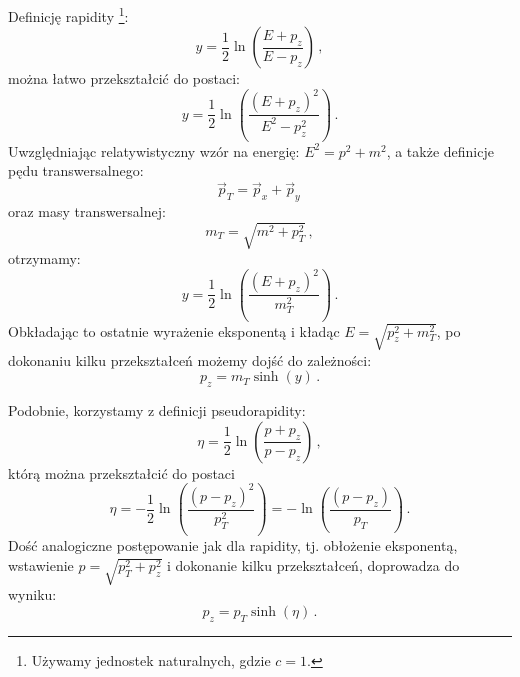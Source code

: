 \documentclass[a4paper,12pt]{article}
\begin{document}
Definicję rapidity \footnote{Używamy jednostek naturalnych, gdzie $c=1$.}:
\begin{equation} \label{eq:rapid}
y = \frac{1}{2} \ln \left( \frac{E + p_z}{E - p_z} \right)\,,
\end{equation}
można łatwo przekształcić do postaci:
\begin{equation} \label{eq:rapid1}
y = \frac{1}{2} \ln \left( \frac{(E + p_z)^2}{E^2 - p_z^2} \right)\,.
\end{equation}
Uwzględniając relatywistyczny wzór na energię: $E^2 = p^2 + m^2$, a także definicje pędu transwersalnego:
\begin{equation} \label{eq:pt}
\vec{p}_T = \vec{p}_x + \vec{p}_y \,
\end{equation}
oraz masy transwersalnej:
\begin{equation} \label{eq:mt}
m_T = \sqrt{m^2 + p_T^2} \,,
\end{equation}
otrzymamy:
\begin{equation} \label{eq:rapid2}
y = \frac{1}{2} \ln \left( \frac{(E + p_z)^2}{m_T^2} \right)\,.
\end{equation}
Obkładając to ostatnie wyrażenie eksponentą i kładąc $E = \sqrt{p_z^2 + m_T^2}$, po dokonaniu kilku przekształceń możemy dojść do zależności:
\begin{equation} \label{eq:pz-rapid}
p_z = m_{T} \sinh(y)\,.
\end{equation}

Podobnie, korzystamy z definicji pseudorapidity:
\begin{equation} \label{eq:pseudorap}
\eta = \frac{1}{2} \ln \left( \frac{p + p_z}{p - p_z} \right)\,,
\end{equation}
którą można przekształcić do postaci
\begin{equation} \label{eq:pseudorap1}
\eta = -\frac{1}{2} \ln \left( \frac{(p - p_z)^2}{p_T^2} \right) = -\ln \left( \frac{(p - p_z)}{p_T} \right) \,.
\end{equation}
Dość analogiczne postępowanie jak dla rapidity, tj. obłożenie eksponentą, wstawienie $p = \sqrt{p_T^2 + p_z^2}$ i dokonanie kilku przekształceń, doprowadza do wyniku:
\begin{equation} \label{eq:pz-pseudorap}
p_z = p_{T} \sinh(\eta)\,.
\end{equation}
\end{document}
